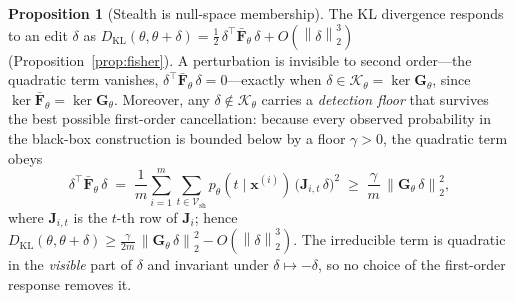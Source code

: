 \documentclass[11pt]{article}
\newcommand{\Vsh}{\mathcal{V}_{\mathrm{sh}}}
\newcommand{\norm}[1]{\left\lVert #1 \right\rVert}
\theoremstyle{definition}
\newtheorem{proposition}{Proposition}
\begin{document}
\begin{proposition}[Stealth is null-space membership]
\label{prop:stealth}
The KL divergence responds to an edit $\delta$ as
$D_{\mathrm{KL}}(\theta, \theta+\delta) = \tfrac12\, \delta^\top
\bar{\bm{F}}_\theta\, \delta + O(\norm{\delta}_2^3)$
(Proposition~\ref{prop:fisher}). A perturbation is invisible to second
order---the quadratic term vanishes, $\delta^\top \bar{\bm{F}}_\theta\, \delta
= 0$---exactly when $\delta \in \mathcal{K}_\theta = \ker \bm{G}_\theta$, since
$\ker \bar{\bm{F}}_\theta = \ker \bm{G}_\theta$. Moreover, any $\delta \notin
\mathcal{K}_\theta$ carries a \emph{detection floor} that survives the best
possible first-order cancellation: because every observed probability in the
black-box construction is bounded below by a floor $\gamma > 0$, the quadratic
term obeys
\begin{equation}
  \delta^\top \bar{\bm{F}}_\theta\, \delta
  \;=\; \frac1m \sum_{i=1}^m \sum_{t \in \Vsh}
      p_\theta(t \mid \bm{x}^{(i)})\, \big(\bm{J}_{i,t}\,\delta\big)^2
  \;\ge\; \frac{\gamma}{m}\, \norm{\bm{G}_\theta\,\delta}_2^2,
  \label{eq:floor}
\end{equation}
where $\bm{J}_{i,t}$ is the $t$-th row of $\bm{J}_i$; hence
$D_{\mathrm{KL}}(\theta, \theta+\delta) \ge \frac{\gamma}{2m}\,
\norm{\bm{G}_\theta\,\delta}_2^2 - O(\norm{\delta}_2^3)$. The irreducible term
is quadratic in the \emph{visible} part of $\delta$ and invariant under
$\delta \mapsto -\delta$, so no choice of the first-order response removes it.
\end{proposition}
\end{document}
